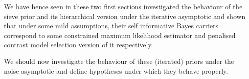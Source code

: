 We have hence seen in these two first sections investigated the behaviour of the sieve prior and its hierarchical version under the iterative asymptotic and shown that under some mild assumptions, their self informative Bayes carriers correspond to some constrained maximum likelihood estimator and penalised contrast model selection version of it respectively.

We should now investigate the behaviour of these (iterated) priors under the noise asymptotic and define hypotheses under which they behave properly.